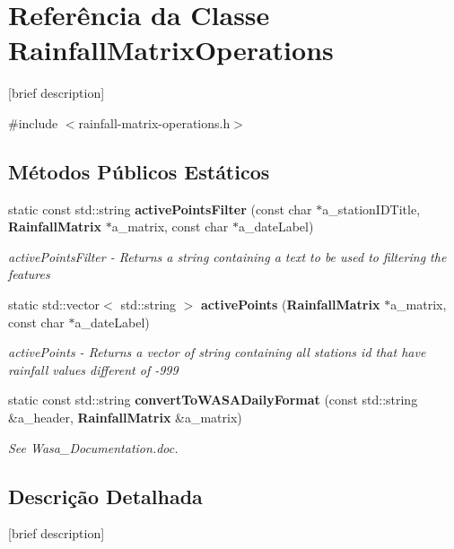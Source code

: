 \section{Referência da Classe Rainfall\+Matrix\+Operations}
\label{class_rainfall_matrix_operations}


[brief description]  




{\ttfamily \#include $<$rainfall-\/matrix-\/operations.\+h$>$}

\subsection*{Métodos Públicos Estáticos}
\begin{DoxyCompactItemize}
\item 
static const std\+::string {\bf active\+Points\+Filter} (const char $\ast$a\+\_\+station\+I\+D\+Title, {\bf Rainfall\+Matrix} $\ast$a\+\_\+matrix, const char $\ast$a\+\_\+date\+Label)
\begin{DoxyCompactList}\small\item\em active\+Points\+Filter -\/ Returns a string containing a text to be used to filtering the features \end{DoxyCompactList}\item 
static std\+::vector$<$ std\+::string $>$ {\bf active\+Points} ({\bf Rainfall\+Matrix} $\ast$a\+\_\+matrix, const char $\ast$a\+\_\+date\+Label)
\begin{DoxyCompactList}\small\item\em active\+Points -\/ Returns a vector of string containing all stations id that have rainfall values different of -\/999 \end{DoxyCompactList}\item 
static const std\+::string {\bf convert\+To\+W\+A\+S\+A\+Daily\+Format} (const std\+::string \&a\+\_\+header, {\bf Rainfall\+Matrix} \&a\+\_\+matrix)
\begin{DoxyCompactList}\small\item\em See Wasa\+\_\+\+Documentation.\+doc. \end{DoxyCompactList}\end{DoxyCompactItemize}


\subsection{Descrição Detalhada}
[brief description] 

